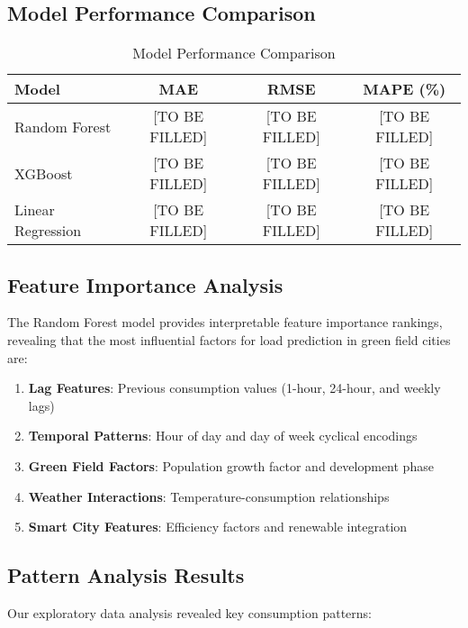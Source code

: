 \documentclass[12pt,a4paper]{article}
\begin{document}
\subsection{Model Performance Comparison}
\begin{table}[H]
\centering
\caption{Model Performance Comparison}
\begin{tabular}{@{}lccc@{}}
\toprule
\textbf{Model} & \textbf{MAE} & \textbf{RMSE} & \textbf{MAPE (\%)} \\
\midrule
Random Forest & [TO BE FILLED] & [TO BE FILLED] & [TO BE FILLED] \\
XGBoost & [TO BE FILLED] & [TO BE FILLED] & [TO BE FILLED] \\
Linear Regression & [TO BE FILLED] & [TO BE FILLED] & [TO BE FILLED] \\
\bottomrule
\end{tabular}
\label{tab:model_performance}
\end{table}

\subsection{Feature Importance Analysis}
The Random Forest model provides interpretable feature importance rankings, revealing that the most influential factors for load prediction in green field cities are:

\begin{enumerate}
    \item \textbf{Lag Features}: Previous consumption values (1-hour, 24-hour, and weekly lags)
    \item \textbf{Temporal Patterns}: Hour of day and day of week cyclical encodings
    \item \textbf{Green Field Factors}: Population growth factor and development phase
    \item \textbf{Weather Interactions}: Temperature-consumption relationships
    \item \textbf{Smart City Features}: Efficiency factors and renewable integration
\end{enumerate}

\subsection{Pattern Analysis Results}
Our exploratory data analysis revealed key consumption patterns:
\end{document}
